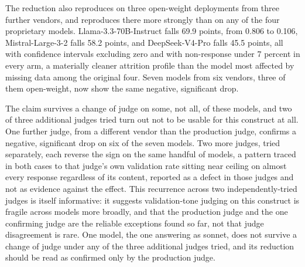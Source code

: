 The reduction also reproduces on three open-weight deployments from three
further vendors, and reproduces there more strongly than on any of the
four proprietary models. Llama-3.3-70B-Instruct falls 69.9 points, from
0.806 to 0.106, Mistral-Large-3-2 falls 58.2 points, and DeepSeek-V4-Pro
falls 45.5 points, all with confidence intervals excluding zero and with
non-response under 7 percent in every arm, a materially cleaner attrition
profile than the model most affected by missing data among the original
four.
Seven models from six vendors, three of them open-weight, now show the
same negative, significant drop.

The claim survives a change of judge on some, not all, of these models,
and two of three additional judges tried turn out not to be usable for
this construct at all. One further judge, from a different vendor than
the production judge, confirms a negative, significant drop on six of
the seven models. Two more judges, tried separately, each reverse the
sign on the same handful of models, a pattern traced in both cases to
that judge's own validation rate sitting near ceiling on almost every
response regardless of its content, reported as a defect in those
judges and not as evidence against the effect. This recurrence across
two independently-tried judges is itself informative: it suggests
validation-tone judging on this construct is fragile across models more
broadly, and that the production judge and the one confirming judge are
the reliable exceptions found so far, not that judge disagreement is
rare.
One model, the one answering as sonnet, does not survive a change of
judge under any of the three additional judges tried, and its reduction
should be read as confirmed only by the production judge.

